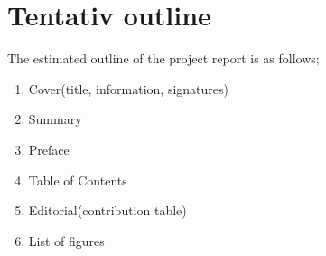 \section{Tentativ outline}
The estimated outline of the project report is as follows;

\renewcommand{\labelenumi}{\Roman{enumi}}
\begin{enumerate}
    \item Cover(title, information, signatures)
    \item Summary
    \item Preface
    \item Table of Contents
    \item Editorial(contribution table)
    \item List of figures
\end{enumerate}
\renewcommand{\labelenumi}{\arabic{enumi}}


